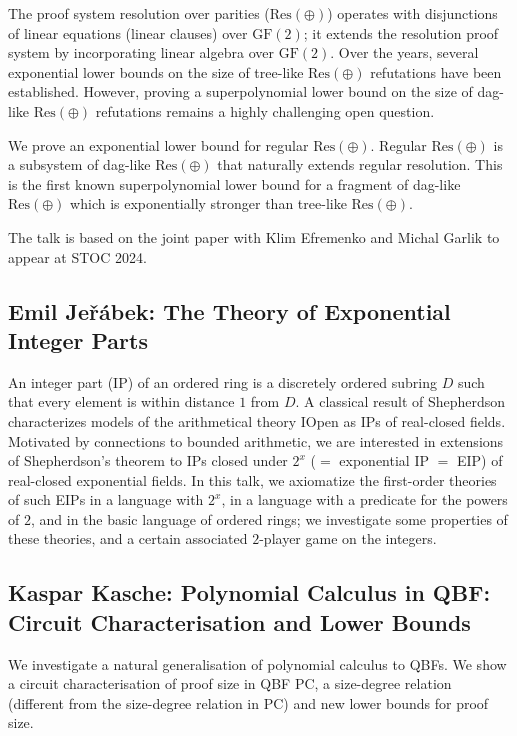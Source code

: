 \documentclass[11pt]{article}
\begin{document}
The proof system resolution over parities ($\mathrm{Res}(\oplus)$) operates with disjunctions of linear equations (linear clauses) over $\mathrm{GF}(2)$; it extends the resolution proof system by incorporating linear algebra over $\mathrm{GF}(2)$. Over the years, several exponential lower bounds on the size of tree-like $\mathrm{Res}(\oplus)$ refutations have been established. However, proving a superpolynomial lower bound on the size of dag-like $\mathrm{Res}(\oplus)$ refutations remains a highly challenging open question.

We prove an exponential lower bound for regular $\mathrm{Res}(\oplus)$. Regular $\mathrm{Res}(\oplus)$ is a subsystem of dag-like $\mathrm{Res}(\oplus)$ that naturally extends regular resolution. This is the first known superpolynomial lower bound for a fragment of dag-like $\mathrm{Res}(\oplus)$ which is exponentially stronger than tree-like $\mathrm{Res}(\oplus)$.

The talk is based on the joint paper with Klim Efremenko and Michal Garlik to appear at STOC 2024.

\subsection*{Emil Je\v{r}\'{a}bek: The Theory of Exponential Integer Parts}\label{Jerabek}

An integer part (IP) of an ordered ring is a discretely ordered
subring $D$ such that every element is within distance $1$ from $D$.
A classical result of Shepherdson characterizes models of the
arithmetical theory IOpen as IPs of real-closed fields. Motivated by
connections to bounded arithmetic, we are interested in extensions of
Shepherdson's theorem to IPs closed under $2^x$ ($=$ exponential IP $=$ EIP)
of real-closed exponential fields. In this talk, we axiomatize the
first-order theories of such EIPs in a language with $2^x$, in a language
with a predicate for the powers of $2$, and in the basic language of
ordered rings; we investigate some properties of these theories, and
a certain associated $2$-player game on the integers.


\subsection*{Kaspar Kasche: Polynomial Calculus in QBF: Circuit Characterisation and
Lower Bounds}\label{Kasche}

We investigate a natural generalisation of polynomial calculus to QBFs. We show a circuit characterisation of proof size in QBF PC, a size-degree relation (different from the size-degree relation in PC) and new lower bounds for proof size. 
\end{document}
